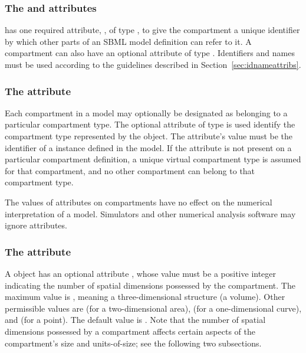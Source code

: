 \subsubsection{The  and  attributes}

\Compartment has one required attribute, , of type
, to give the compartment a unique identifier by
which other parts of an SBML model definition can refer to it.  A
compartment can also have an optional  attribute of type
.  Identifiers and names must be used according
to the guidelines described in Section~\ref{sec:idnameattribs}.


\subsubsection{The  attribute}
\label{sec:compartment-compartment-type}

Each compartment in a model may optionally be designated as
belonging to a particular compartment type.  The optional attribute
 of type  is used identify
the compartment type represented by the \Compartment object.
The  attribute's value must be the identifier
of a \CompartmentType instance defined in the model.  If the
 attribute is not present on a particular
compartment definition, a unique virtual compartment type is
assumed for that compartment, and no other compartment can belong
to that compartment type.

The values of  attributes on compartments
have no effect on the numerical interpretation of a model.
Simulators and other numerical analysis software may ignore
 attributes.


\subsubsection{The  attribute}

A \Compartment object has an optional attribute
, whose value must be a positive integer
indicating the number of spatial dimensions possessed by the
compartment.  The maximum value is , meaning a
three-dimensional structure (a volume).  Other permissible values
are  (for a two-dimensional area),  (for a
one-dimensional curve), and  (for a point).  The default
value is . Note that the number of spatial dimensions
possessed by a compartment affects certain aspects of the
compartment's size and units-of-size; see the following two
subsections.


